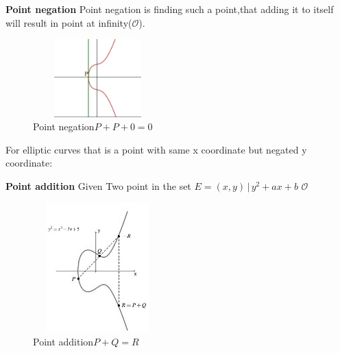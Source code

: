 \documentclass{article}
\begin{document}
\hspace{4cm}
\begin{centre}
\newline
\end{centre}

\hspace{4cm}
\begin{centre}
\end{centre}

\newline
\textbf{Point negation}
\newline
Point negation is finding such a point,that adding it to itself will result in point at infinity(\({\mathcal{O}}\)).
\begin{figure}[h]
\centering
\includegraphics[width=5cm, height=3cm]{P.jpeg}
 \caption{Point negation\:\(P+P+0=0\)}
\centering
\end{figure}

\hspace{4.5cm}
\begin{centre}
\end{centre}

For elliptic curves that is a point with same x coordinate but negated y coordinate:

\begin{centre}
\end{centre}
\begin{centre}
\end{centre}
\begin{centre}
\end{centre}

\newline
\textbf{Point addition}
\newline
Given Two point in the set
\(E={(x,y)\,|\,y^2+ax+b}\) \cup \:\(\mathcal{O}\)

\begin{figure}[h]
\centering
\includegraphics[width=5cm, height=5cm]{Point-Addition-on-the-Elliptic-Curve-18.png}
 \caption{Point addition\:\(P+Q=R\)}
\centering
\end{figure}
\end{document}
